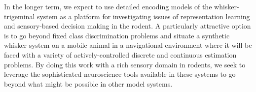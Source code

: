 In the longer term, we expect to use detailed encoding models of the whisker-trigeminal system as a platform for investigating issues of representation learning and sensory-based decision making in the rodent. 
A particularly attractive option is to go beyond fixed class discrimination problems and situate a synthetic whisker system on a mobile animal in a navigational environment where it will be faced with a variety of actively-controlled discrete and continuous estimation problems.
By doing this work with a rich sensory domain in rodents, we seek to leverage the sophisticated neuroscience tools available in these systems to go beyond what might be possible in other model systems.  

